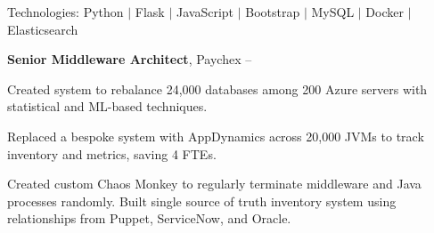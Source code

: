 \documentclass[MMMMyyyy,nonstopmode]{simpleresumecv_stacked}
\newcommand{\tech}[1]{\Gap\textrm{Technologies:} #1}
\newif\ifLOCATION
\begin{document}
\begin{Body}
\begin{Detail}

\tech{Python $|$ Flask $|$ JavaScript $|$ Bootstrap $|$ MySQL $|$ Docker $|$ Elasticsearch}

\end{Detail}

\BigGap


\Entry
\textbf{Senior Middleware Architect}, Paychex
\hfill
{} -- 

\ifLOCATION
\hfill
Rochester, New York
\fi

\Gap
\begin{Detail}
\iffalse
At Paychex I worked with multiple cross-functional teams to build: an inventory system to track hosts, JVMs, and databases; machine learning systems in Python to efficiently rebalance databases and predict system utilization; custom Chaos Monkey ro randomly terminate process to find configuration weaknesses; and implemented AppDynamics on over 20,000 JVMs.
\fi

\iftrue
\BulletItem
Created system to rebalance 24,000 databases among 200 Azure servers with statistical and ML-based techniques.


\BulletItem
Replaced a bespoke system with AppDynamics across 20,000 JVMs to track inventory and metrics, saving 4 FTEs.

\BulletItem
Created custom Chaos Monkey to regularly terminate middleware and Java processes randomly. 
\BulletItem
Built single source of truth inventory system using relationships from Puppet, ServiceNow, and Oracle.


\end{Detail}
\end{Body}
\end{document}
